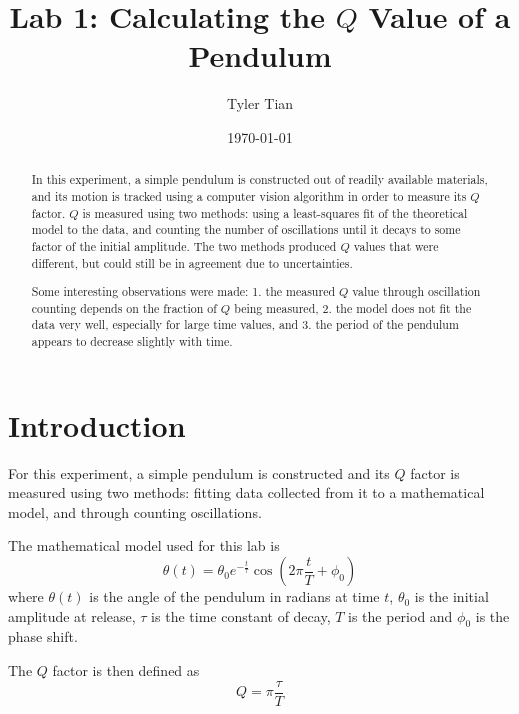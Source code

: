 \documentclass[aps,twocolumn,secnumarabic,nobalancelastpage,amsmath,amssymb,nofootinbib]{revtex4}
\begin{document}
\title{Lab 1: Calculating the \(Q\) Value of a Pendulum}
\author{Tyler Tian}
\date{\today}


\begin{abstract}
In this experiment, a simple pendulum is constructed out of readily available materials, and its motion is tracked using
a computer vision algorithm in order to measure its \(Q\) factor. \(Q\) is measured using two methods: using a
least-squares fit of the theoretical model to the data, and counting the number of oscillations until it decays to some
factor of the initial amplitude. The two methods produced \(Q\) values that were different, but could still be in
agreement due to uncertainties.

Some interesting observations were made: 1. the measured \(Q\) value through oscillation counting depends on the
fraction of \(Q\) being measured, 2. the model does not fit the data very well, especially for large time values, and 3.
the period of the pendulum appears to decrease slightly with time.
\end{abstract}

\maketitle


\section{Introduction}

For this experiment, a simple pendulum is constructed and its \(Q\) factor is measured using two methods:
fitting data collected from it to a mathematical model, and through counting oscillations.

The mathematical model used for this lab is
\begin{equation}
    \theta(t) = \theta_0 e^{-\frac{t}{\tau}}\cos\left(2\pi\frac{t}{T} + \phi_0\right)
    \label{eqn:model}
\end{equation}
where $\theta(t)$ is the angle of the pendulum in radians at time $t$, $\theta_0$ is the initial amplitude at release,
$\tau$ is the time constant of decay, $T$ is the period and $\phi_0$ is the phase shift.

The \(Q\) factor is then defined as
\begin{equation}
    Q = \pi\frac{\tau}{T}
    \label{eqn:q}
\end{equation}
\end{document}
